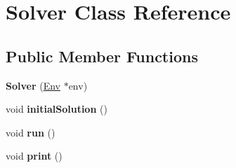\hypertarget{class_solver}{}\section{Solver Class Reference}
\label{class_solver}
\subsection*{Public Member Functions}
\begin{DoxyCompactItemize}
\item 
\mbox{\label{class_solver_a05ec0ef6028f51c1eba417b41a14c2ea}} 
{\bfseries Solver} (\hyperlink{class_env}{Env} $\ast$env)
\item 
\mbox{\label{class_solver_a4b0fc2950022b5e5166b6d3f0564696f}} 
void {\bfseries initial\+Solution} ()
\item 
\mbox{\label{class_solver_a1f31e2d38dacd7e828c1bf428eb2ed96}} 
void {\bfseries run} ()
\item 
\mbox{\label{class_solver_a39ebda60ffaadddc1c4f85bd6cf9209c}} 
void {\bfseries print} ()
\end{DoxyCompactItemize}


